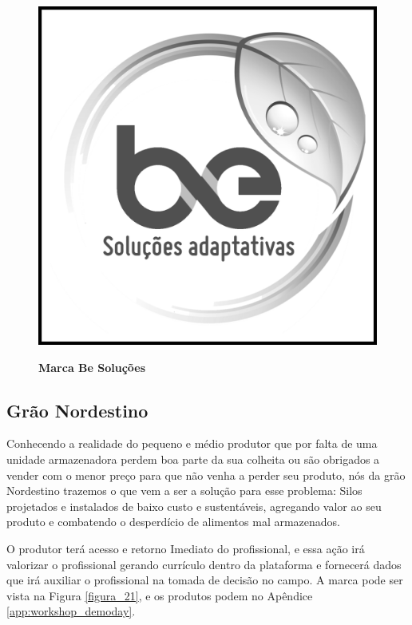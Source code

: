 \begin{figure}[H]
\centering
\caption{\textbf{Marca Be Soluções}}
\includegraphics[scale=0.11]{Imagens/besolucoes.png}
\label{figura_20}
\end{figure}

\subsection{Grão Nordestino}

Conhecendo a realidade do pequeno e médio produtor que por falta de uma unidade armazenadora perdem boa parte da sua colheita ou são obrigados a vender com o menor preço para que não venha a perder seu produto, nós da grão Nordestino trazemos o que vem a ser a solução para esse problema: Silos projetados e instalados de baixo custo e sustentáveis, agregando valor ao seu produto e combatendo o desperdício de alimentos mal armazenados.

O produtor terá acesso e retorno Imediato do profissional, e essa ação irá valorizar o profissional gerando currículo dentro da plataforma e fornecerá dados que irá auxiliar o profissional na tomada de decisão no campo. A marca pode ser vista na Figura \ref{figura_21}, e os produtos podem no Apêndice \ref{app:workshop_demoday}.


